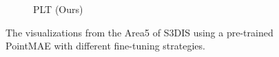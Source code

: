 \begin{figure}
\begin{subfigure}{0.235\textwidth}
        \caption{PLT (Ours)}
        \label{fig:s3dis6}
    \end{subfigure}
    \caption{The visualizations from the Area5 of S3DIS using a pre-trained PointMAE with different fine-tuning strategies.}
    \label{fig:s3dis}
\end{figure}
